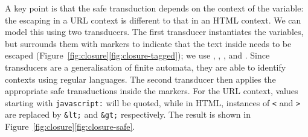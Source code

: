 A key point is that the safe transduction depends on the context of the variable:
the escaping in a URL context is different to that in an HTML context.
We can model this using two transducers.
The first transducer instantiates the variables, but surrounds them with markers to indicate that the text inside needs to be escaped
(Figure~\ref{fig:closure}\ref{fig:closure-tagged});
we use \urlstarttag, \urlendtag, \htmlstarttag, and \htmlendtag.
Since transducers are a generalisation of finite automata, they are able to identify contexts using regular languages.
The second transducer then applies the appropriate safe transductions inside the markers.
For the URL context, values starting with \texttt{javascript:} will be quoted, while in HTML, instances of \texttt{<} and \texttt{>} are replaced by \texttt{\&lt;} and \texttt{\&gt;} respectively.
The result is shown in Figure~\ref{fig:closure}\ref{fig:closure-safe}.




